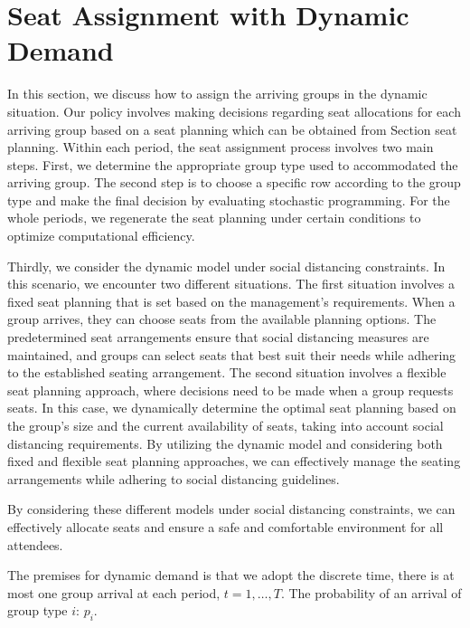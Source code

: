 


\section{Seat Assignment with Dynamic Demand}\label{sec_dynamic_seat}

In this section, we discuss how to assign the arriving groups in the dynamic situation. Our policy involves making decisions regarding seat allocations for each arriving group based on a seat planning which can be obtained from Section seat planning. Within each period, the seat assignment process involves two main steps. First, we determine the appropriate group type used to accommodated the arriving group. The second step is to choose a specific row according to the group type and make the final decision by evaluating stochastic programming. For the whole periods, we regenerate the seat planning under certain conditions to optimize computational efficiency.

Thirdly, we consider the dynamic model under social distancing constraints. In this scenario, we encounter two different situations. The first situation involves a fixed seat planning that is set based on the management's requirements. When a group arrives, they can choose seats from the available planning options. The predetermined seat arrangements ensure that social distancing measures are maintained, and groups can select seats that best suit their needs while adhering to the established seating arrangement. The second situation involves a flexible seat planning approach, where decisions need to be made when a group requests seats. In this case, we dynamically determine the optimal seat planning based on the group's size and the current availability of seats, taking into account social distancing requirements. By utilizing the dynamic model and considering both fixed and flexible seat planning approaches, we can effectively manage the seating arrangements while adhering to social distancing guidelines.


By considering these different models under social distancing constraints, we can effectively allocate seats and ensure a safe and comfortable environment for all attendees.

The premises for dynamic demand is that we adopt the discrete time, there is at most one group arrival at each period, $t = 1, \ldots, T$. The  probability of an arrival of group type $i$: $p_i$.


